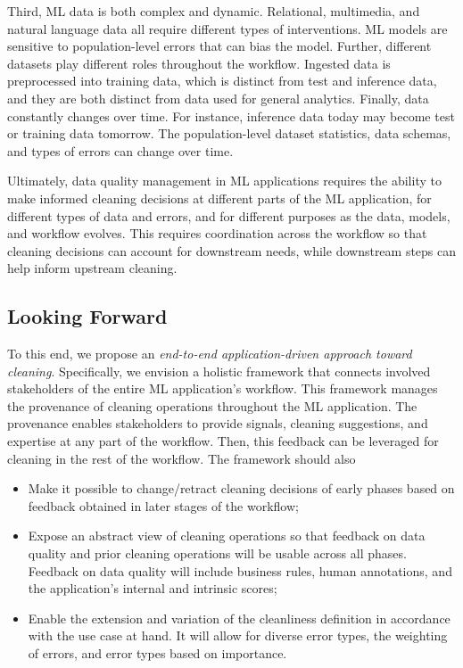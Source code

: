 \documentclass[11pt,dvipsnames]{article}
\begin{document}
\newpage%
Third, ML data is both complex and dynamic.  Relational, multimedia, and natural language data all require different types of interventions.  ML models are sensitive to population-level errors that can bias the model.  Further, different datasets play different roles throughout the workflow.  Ingested data is preprocessed into training data, which is distinct from test and inference data, and they are both distinct from data used for general analytics.     Finally, data constantly changes over time.  For instance, inference data today may become test or training data tomorrow.   The population-level dataset statistics, data schemas, and types of errors can change over time.  

Ultimately, data quality management in ML applications requires the ability to make informed cleaning decisions at different parts of the ML application, for different types of data and errors, and for different purposes as the data, models, and workflow evolves.  This requires coordination across the workflow so that cleaning decisions can account for downstream needs, while downstream steps can help inform upstream cleaning.   





\subsection{Looking Forward}


To this end, we propose an \emph{end-to-end application-driven approach toward cleaning}. Specifically, we envision a holistic framework that connects involved stakeholders of the entire ML application's workflow.   This framework manages the provenance of cleaning operations throughout the ML application. The provenance enables stakeholders to provide signals, cleaning suggestions, and expertise at any part of the workflow. Then, this feedback can be leveraged for cleaning in the rest of the workflow.    The framework should also
\begin{itemize}[leftmargin=*]
    \item Make it possible to change/retract cleaning decisions of early phases based on feedback obtained in later stages of the workflow; 
    \item Expose an abstract view of cleaning operations so that feedback on data quality and prior cleaning operations will be usable across all phases. Feedback on data quality will include business rules, human annotations, and the application's internal and intrinsic scores;
    \item Enable the extension and variation of the cleanliness definition in accordance with the use case at hand. It will allow for diverse error types, the weighting of errors, and error types based on importance. 
\end{itemize}
\end{document}
